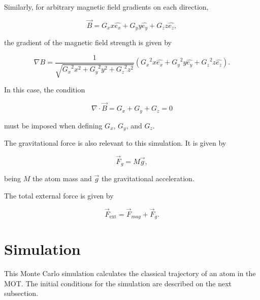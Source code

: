 \documentclass[12pt,a4paper,twoside]{article}
\begin{document}
Similarly, for arbitrary magnetic field gradients on each direction,

\begin{equation}
	\vec{B} = G_x x \hat{e_x} + G_y y \hat{e_y} + G_z z \hat{e_z},
\end{equation}
\noindent

the gradient of the magnetic field strength is given by

\begin{equation}
	\nabla B = \dfrac{1}{\sqrt{{G_x}^2 x^2 + {G_y}^2 y^2 + {G_z}^2 z^2}}
	\left(
	{G_x}^2 x \hat{e_x} +
	{G_y}^2 y \hat{e_y} +
	{G_z}^2 z \hat{e_z}
	\right).
\end{equation}

In this case, the condition

\begin{equation}
	\nabla\cdot\vec{B} = G_x + G_y + G_z = 0
\end{equation}

\noindent
must be imposed when defining $G_x$, $G_y$, and $G_z$.

The gravitational force is also relevant to this simulation. It is given by

\begin{equation}
	\vec{F}_g = M\vec{g},
\end{equation}

\noindent
being $M$ the atom mass and $\vec{g}$ the gravitational acceleration.

The total external force is given by

\begin{equation}
	\vec{F}_\mathrm{ext} = \vec{F}_{mag} + \vec{F}_g.
\end{equation}



%






\section{Simulation}

This Monte Carlo simulation calculates the classical trajectory of an atom in the MOT. The initial conditions for the simulation are described on the next subsection.
\end{document}
